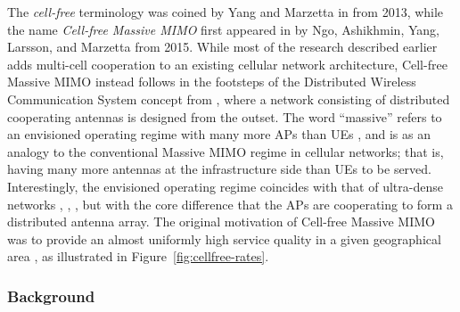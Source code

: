 The \emph{cell-free} terminology was coined by Yang and Marzetta in \cite{Yang2013b} from 2013, while the name \emph{Cell-free Massive \gls{MIMO}} first appeared in \cite{Ngo2015a} by Ngo, Ashikhmin, Yang, Larsson, and Marzetta from 2015. 
While most of the research described earlier adds multi-cell cooperation to an existing cellular network architecture, Cell-free Massive \gls{MIMO} instead follows in the footsteps of the Distributed Wireless Communication System concept from \cite{Zhou2003a}, where a network consisting of distributed cooperating antennas is designed from the outset. 
The word ``massive'' refers to an envisioned operating regime with many more \glspl{AP} than \glspl{UE} \cite{Ngo2015a}, and is as an analogy to the conventional Massive MIMO regime in cellular networks; that is, having many more antennas at the infrastructure side than UEs to be served. Interestingly, the envisioned operating regime coincides with that of ultra-dense networks \cite{Hwang2013a}, \cite{Kamel2016a}, \cite{Stefanatos2014a}, but with the core difference that the APs are cooperating to form a distributed antenna array. The original motivation of Cell-free Massive \gls{MIMO} was to provide an almost uniformly high service quality in a given geographical area \cite{Ngo2015a}, as illustrated in Figure~\ref{fig:cellfree-rates}. 

\enlargethispage{\baselineskip} 

\subsubsection{Background}

